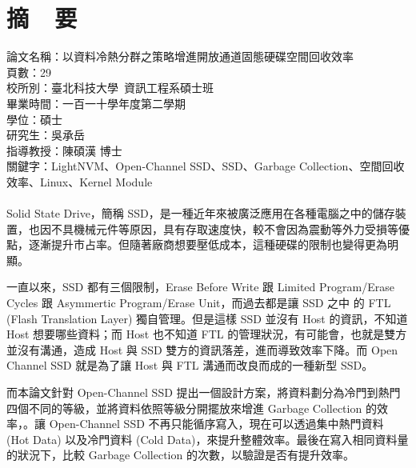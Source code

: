 \chapter*{摘~~要}


\noindent
論文名稱：以資料冷熱分群之策略增進開放通道固態硬碟空間回收效率 \\%
頁數：29\\
校所別：臺北科技大學~資訊工程系碩士班\\
畢業時間：一百一十學年度第二學期\\
學位：碩士\\
研究生：吳承岳\\
指導教授：陳碩漢 博士\\
\noindent
關鍵字：LightNVM、Open-Channel SSD、SSD、Garbage Collection、空間回收效率、Linux、Kernel Module\\
\hspace*{\fill}\\
%
\indent
Solid State Drive，簡稱 SSD，是一種近年來被廣泛應用在各種電腦之中的儲存裝置，也因不具機械元件等原因，具有存取速度快，較不會因為震動等外力受損等優點，逐漸提升市占率。但隨著廠商想要壓低成本，這種硬碟的限制也變得更為明顯。

一直以來，SSD 都有三個限制，Erase Before Write 跟 Limited Program/Erase Cycles 跟 Asymmertic Program/Erase Unit，而過去都是讓 SSD 之中 的 FTL (Flash Translation Layer) 獨自管理。但是這樣 SSD 並沒有 Host 的資訊，不知道 Host 想要哪些資料；而 Host 也不知道 FTL 的管理狀況，有可能會，也就是雙方並沒有溝通，造成 Host 與 SSD 雙方的資訊落差，進而導致效率下降。而 Open Channel SSD 就是為了讓 Host 與 FTL 溝通而改良而成的一種新型 SSD。

\indent
而本論文針對 Open-Channel SSD 提出一個設計方案，將資料劃分為冷門到熱門四個不同的等級，並將資料依照等級分開擺放來增進 Garbage Collection 的效率，。讓 Open-Channel SSD 不再只能循序寫入，現在可以透過集中熱門資料 (Hot Data) 以及冷門資料 (Cold Data)，來提升整體效率。最後在寫入相同資料量的狀況下，比較 Garbage Collection 的次數，以驗證是否有提升效率。


